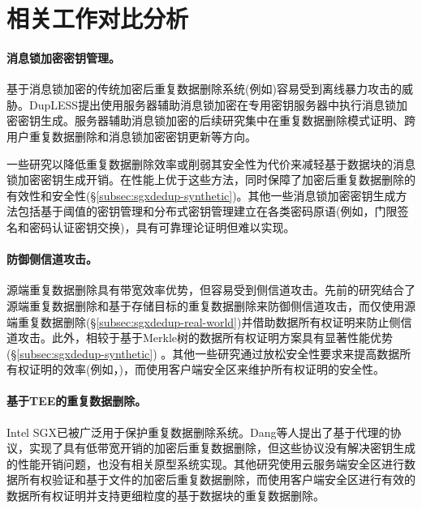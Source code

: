\section{相关工作对比分析}
\label{sec:sgxdedup-related_work}

\paragraph*{消息锁加密密钥管理。} 基于消息锁加密\cite{bellare2013MLE}的传统加密后重复数据删除系统(例如\cite{adya2002farsite,cox2002pastiche,shah15})容易受到离线暴力攻击\cite{bellare2013DupLESS}的威胁。DupLESS\cite{bellare2013DupLESS}提出使用服务器辅助消息锁加密在专用密钥服务器中执行消息锁加密密钥生成。服务器辅助消息锁加密的后续研究集中在重复数据删除模式证明\cite{armknecht2015transparent}、跨用户重复数据删除\cite{zhou2015secdep}和消息锁加密密钥更新\cite{qin17}等方向。

一些研究以降低重复数据删除效率\cite{zhou2015secdep,qin17}或削弱其安全性\cite{li2020Info}为代价来减轻基于数据块的消息锁加密密钥生成开销。\sysnameS 在性能上优于这些方法，同时保障了加密后重复数据删除的有效性和安全性(\S\ref{subsec:sgxdedup-synthetic})。其他一些消息锁加密密钥生成方法包括基于阈值的密钥管理\cite{duan2014distributed}和分布式密钥管理\cite{liu2015secure}建立在各类密码原语(例如，门限签名\cite{duan2014distributed}和密码认证密钥交换\cite{liu2015secure})，具有可靠理论证明但难以实现。

\paragraph*{防御侧信道攻击。}源端重复数据删除具有带宽效率优势，但容易受到侧信道攻击\cite{harnik2010side}。先前的研究\cite{harnik2010side, li15}结合了源端重复数据删除和基于存储目标的重复数据删除来防御侧信道攻击，而\sysnameS 仅使用源端重复数据删除(\S\ref{subsec:sgxdedup-real-world})并借助数据所有权证明来防止侧信道攻击。此外，\sysnameS 相较于基于Merkle树的数据所有权证明方案具有显著性能优势(\S\ref{subsec:sgxdedup-synthetic}) 。其他一些研究通过放松安全性要求来提高数据所有权证明的效率(例如，\cite{pietro12,xu2013weak})，而\sysnameS 使用客户端安全区来维护所有权证明的安全性。

\paragraph*{基于TEE的重复数据删除。} Intel SGX\cite{sgx}已被广泛用于保护重复数据删除系统。Dang等人\cite{dang2017Privacy}提出了基于代理的协议，实现了具有低带宽开销的加密后重复数据删除，但这些协议没有解决密钥生成的性能开销问题，也没有相关原型系统实现。其他研究使用云服务端安全区进行数据所有权验证\cite{you2020Proofs}和基于文件的加密后重复数据删除\cite{fuhry2020segshare}，而\sysnameS 使用客户端安全区进行有效的数据所有权证明并支持更细粒度的基于数据块的重复数据删除。
